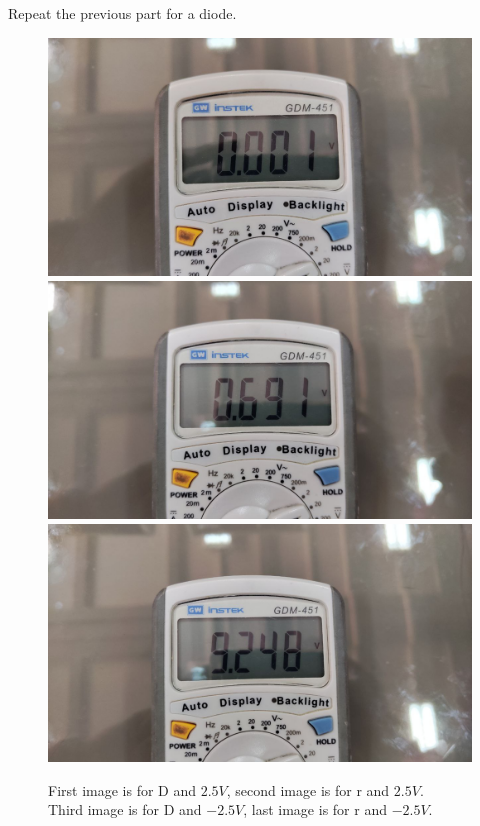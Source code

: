 \documentclass[11pt]{article}
\begin{document}
\begin{question}
\begin{subquestion}{Repeat the previous part for a diode.}
{\begin{figure}[H]
                \includegraphics[scale=0.08,angle=0]{Fig/37.jpeg}
                \includegraphics[scale=0.08,angle=0]{Fig/38.jpeg}
                \includegraphics[scale=0.08,angle=0]{Fig/39.jpeg}
                \caption{First image is for D and $2.5V$, second image is for r and $2.5V$. \\
                    \hspace*{14mm} Third image is for D and $-2.5V$, last image is for r and $-2.5V$.}
            \end{figure}


}
\end{subquestion}
\end{question}
\end{document}
